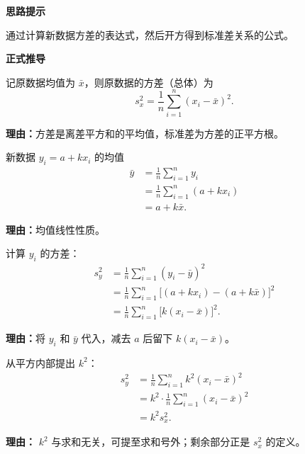 \begin{proofbox}

	\textbf{\textcolor{CProof}{思路提示}}

	通过计算新数据方差的表达式，然后开方得到标准差关系的公式。

	\medskip
	\textbf{\textcolor{CProof}{正式推导}}
	\begin{description}[style=nextline, leftmargin=2.8em, labelsep=0.5em, itemsep=0.55em]
		\item[\textbf{步骤一（定义原方差）：}]
			记原数据均值为 $\bar{x}$，则原数据的方差（总体）为
			\[
				s_x^2 = \frac{1}{n}\sum_{i=1}^n (x_i - \bar{x})^2 .
			\]
			\par\textbf{理由：}方差是离差平方和的平均值，标准差为方差的正平方根。

		\item[\textbf{步骤二（新数据均值）：}]
			新数据 $y_i = a + kx_i$ 的均值
			\[
				\begin{aligned}
					\bar{y} &= \frac{1}{n}\sum_{i=1}^n y_i \\
					&= \frac{1}{n}\sum_{i=1}^n (a + kx_i) \\
					&= a + k\bar{x} .
			\end{aligned}
			\]
			\par\textbf{理由：}均值线性性质。

		\item[\textbf{步骤三（新数据方差展开）：}]
			计算 $y_i$ 的方差：
			\[
				\begin{aligned}
					s_y^2 &= \frac{1}{n}\sum_{i=1}^n (y_i - \bar{y})^2 \\
					&= \frac{1}{n}\sum_{i=1}^n \bigl[(a + kx_i) - (a + k\bar{x})\bigr]^2 \\
					&= \frac{1}{n}\sum_{i=1}^n \bigl[k(x_i - \bar{x})\bigr]^2 .
			\end{aligned}
			\]
			\par\textbf{理由：}将 $y_i$ 和 $\bar{y}$ 代入，减去 $a$ 后留下 $k(x_i - \bar{x})$。

		\item[\textbf{步骤四（提取公因式）：}]
			从平方内部提出 $k^2$：
			\[
				\begin{aligned}
					s_y^2 &= \frac{1}{n}\sum_{i=1}^n k^2 (x_i - \bar{x})^2 \\
					&= k^2 \cdot \frac{1}{n}\sum_{i=1}^n (x_i - \bar{x})^2 \\
					&= k^2 s_x^2 .
			\end{aligned}
			\]
			\par\textbf{理由：} $k^2$ 与求和无关，可提至求和号外；剩余部分正是 $s_x^2$ 的定义。


\end{description}
\end{proofbox}
